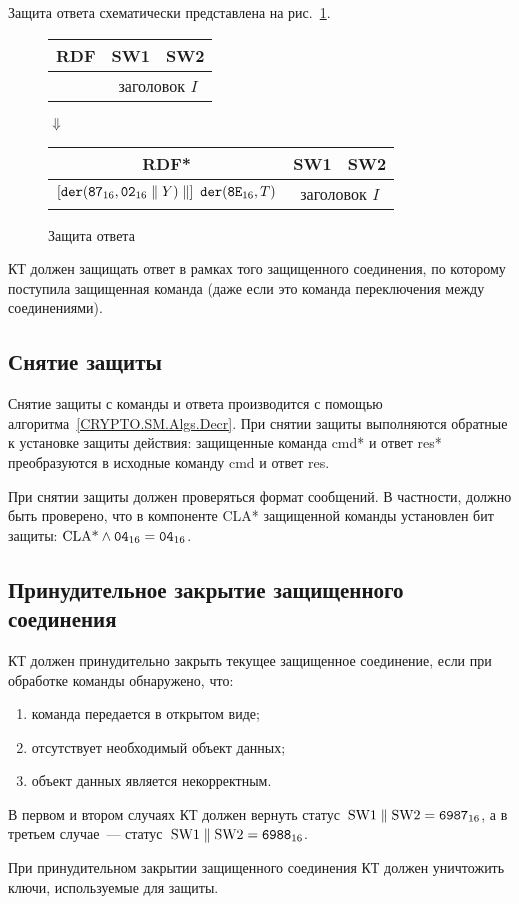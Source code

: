 Защита ответа схематически представлена на рис.~\ref{Fig.CMDS.ResEncr}. 

\begin{figure}[!h]
\begin{center}
\begin{tabular}{|c|c|c|}
\hline
RDF & SW1 & SW2 \\
\hline
\hline
[сообщение $X$] & \multicolumn{2}{|c|}{заголовок $I$} \\
\hline
\end{tabular}

\vskip3pt$\Downarrow$\vskip3pt

\begin{tabular}{|c|c|c|}
\hline
RDF* & SW1 & SW2 \\
\hline
\hline
$\left[\texttt{der}(\texttt{87}_{16},\texttt{02}_{16}\parallel Y)\parallel\right]\ \texttt{der}(\texttt{8E}_{16},T)$ & 
\multicolumn{2}{|c|}{заголовок $I$} \\
\hline
\end{tabular}
\end{center}
\caption{Защита ответа}\label{Fig.CMDS.ResEncr}
\end{figure}

КТ должен защищать ответ в рамках того защищенного соединения,
по которому поступила защищенная команда (даже если это команда 
переключения между соединениями). 

\subsection{Снятие защиты}\label{CMDS.SM.Decr}

Снятие защиты с команды и ответа производится с помощью 
алгоритма~\ref{CRYPTO.SM.Algs.Decr}.  
При снятии защиты выполняются обратные к установке защиты действия: 
защищенные команда cmd* и ответ res* преобразуются в исходные команду cmd  
и ответ res.  

При снятии защиты должен проверяться формат сообщений.
В частности, должно быть проверено, что в компоненте CLA* 
защищенной команды установлен бит защиты:
$\text{CLA*}\wedge\texttt{04}_{16}=\texttt{04}_{16}$.

\subsection{Принудительное закрытие защищенного соединения}
\label{CMDS.SM.Stop}

КТ должен принудительно закрыть текущее защищенное соединение, 
если при обработке команды обнаружено, что: 
\begin{enumerate}
\item[1)] команда передается в открытом виде;
\item[2)] отсутствует необходимый объект данных;
\item[3)] объект данных является некорректным.
\end{enumerate}

В первом и втором случаях КТ должен вернуть 
статус~$\text{SW1} \parallel \text{SW2} = \texttt{6987}_{16}$, 
а в третьем случае~--- статус~$\text{SW1} \parallel \text{SW2} = 
\texttt{6988}_{16}$.  

При принудительном закрытии защищенного соединения КТ должен уничтожить 
ключи, используемые для защиты. 
